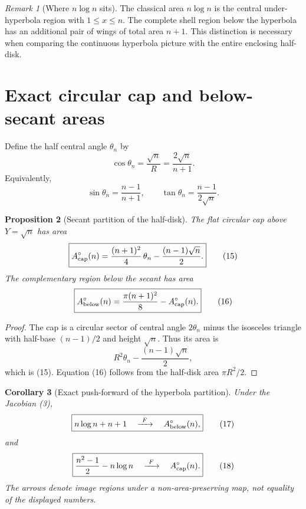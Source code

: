 \documentclass[11pt]{amsart}
\newtheorem{proposition}{Proposition}
\newtheorem{corollary}[proposition]{Corollary}
\theoremstyle{remark}
\newtheorem{remark}[proposition]{Remark}
\begin{document}
\begin{remark}[Where $n\log n$ sits]
The classical area $n\log n$ is the central under-hyperbola region with $1\le x\le n$. The complete shell region below the hyperbola has an additional pair of wings of total area $n+1$. This distinction is necessary when comparing the continuous hyperbola picture with the entire enclosing half-disk.
\end{remark}

\section{Exact circular cap and below-secant areas}
Define the half central angle $\theta_n$ by
\begin{equation}
\cos\theta_n=\frac{\sqrt n}{R}=\frac{2\sqrt n}{n+1}. \tag{13}
\end{equation}
Equivalently,
\begin{equation}
\sin\theta_n=\frac{n-1}{n+1},
\qquad
\tan\theta_n=\frac{n-1}{2\sqrt n}. \tag{14}
\end{equation}

\begin{proposition}[Secant partition of the half-disk]\label{prop:circlepartition}
The flat circular cap above $Y=\sqrt n$ has area
\begin{equation}
\boxed{
A_{\rm cap}^{\circ}(n)
=\frac{(n+1)^2}{4}\,\theta_n
-\frac{(n-1)\sqrt n}{2}.}
\tag{15}
\end{equation}
The complementary region below the secant has area
\begin{equation}
\boxed{
A_{\rm below}^{\circ}(n)
=\frac{\pi(n+1)^2}{8}
-A_{\rm cap}^{\circ}(n).}
\tag{16}
\end{equation}
\end{proposition}

\begin{proof}
The cap is a circular sector of central angle $2\theta_n$ minus the isosceles triangle with half-base $(n-1)/2$ and height $\sqrt n$. Thus its area is
\[
R^2\theta_n-\frac{(n-1)\sqrt n}{2},
\]
which is (15). Equation (16) follows from the half-disk area $\pi R^2/2$.
\end{proof}

\begin{corollary}[Exact push-forward of the hyperbola partition]\label{cor:pushpartition}
Under the Jacobian (3),
\begin{equation}
\boxed{
 n\log n+n+1
\quad\xrightarrow{\ F\ }\quad
A_{\rm below}^{\circ}(n),}
\tag{17}
\end{equation}
and
\begin{equation}
\boxed{
 \frac{n^2-1}{2}-n\log n
\quad\xrightarrow{\ F\ }\quad
A_{\rm cap}^{\circ}(n).}
\tag{18}
\end{equation}
The arrows denote image regions under a non-area-preserving map, not equality of the displayed numbers.
\end{corollary}
\end{document}
